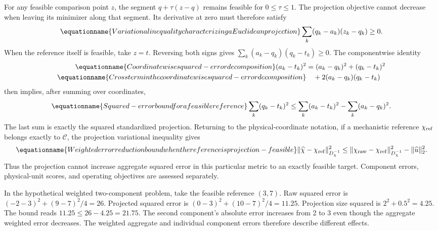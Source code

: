 For any feasible comparison point $z$, the segment $q+\tau(z-q)$ remains feasible for $0\le\tau\le1$. The projection objective cannot decrease when leaving its minimizer along that segment. Its derivative at zero must therefore satisfy
\begin{equation}
\equationname{Variational inequality characterizing a Euclidean projection}
\sum_k(q_k-a_k)(z_k-q_k)\ge0.
\end{equation}
When the reference itself is feasible, take $z=t$. Reversing both signs gives $\sum_k(a_k-q_k)(q_k-t_k)\ge0$. The componentwise identity
\begin{align}
\equationname{Coordinatewise squared-error decomposition}
(a_k-t_k)^2&=(a_k-q_k)^2+(q_k-t_k)^2\\
\equationname{Cross term in the coordinatewise squared-error decomposition}
&\quad+2(a_k-q_k)(q_k-t_k)
\end{align}
then implies, after summing over coordinates,
\begin{equation}
\equationname{Squared-error bound for a feasible reference}
\sum_k(q_k-t_k)^2\le\sum_k(a_k-t_k)^2-\sum_k(a_k-q_k)^2.
\end{equation}
The last sum is exactly the squared standardized projection. Returning to the physical-coordinate notation, if a mechanistic reference $\chi_{\rm ref}$ belongs exactly to $\mathcal C$, the projection variational inequality gives
\begin{equation}
\equationname{Weighted error reduction bound when the reference is projection-feasible}
\|\widehat\chi-\chi_{\rm ref}\|_{D_\chi^{-1}}^2
\le\|\chi_{\rm raw}-\chi_{\rm ref}\|_{D_\chi^{-1}}^2
-\|\widehat u\|_2^2.
\label{eq:plant_projection_error_exact}
\end{equation}
Thus the projection cannot increase aggregate squared error in this particular metric to an exactly feasible target. Component errors, physical-unit scores, and operating objectives are assessed separately.

In the hypothetical weighted two-component problem, take the feasible reference $(3,7)$. Raw squared error is $(-2-3)^2+(9-7)^2/4=26$. Projected squared error is $(0-3)^2+(10-7)^2/4=11.25$. Projection size squared is $2^2+0.5^2=4.25$. The bound reads $11.25\le26-4.25=21.75$. The second component's absolute error increases from 2 to 3 even though the aggregate weighted error decreases. The weighted aggregate and individual component errors therefore describe different effects.

